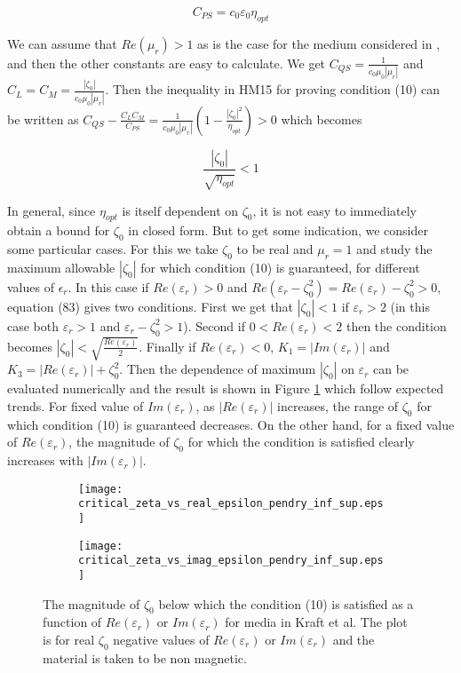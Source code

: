 \begin{equation}
\tag{82}
C_{PS} = c_0\varepsilon_0\eta_{opt}
\end{equation}

We can assume that $Re(\mu_r) > 1$ as is the case for the medium considered in \cite{pendry2016acsphotonics}, 
and then the other constants are easy to calculate. 
We get $C_{QS} = \frac{1}{c_0\mu_0|\mu_r|}$ and $C_L = C_M = \frac{|\zeta_0|}{c_0\mu_0|\mu_r|}$.
Then the inequality in HM15 for proving condition (10) can be written as 
$C_{QS} - \frac{C_LC_M}{C_{PS}} = \frac{1}{c_0\mu_0|\mu_r|}(1 - \frac{|\zeta_0|^2}{\eta_{opt}}) > 0$ which becomes

\begin{equation}
\tag{83}
\frac{|\zeta_0|}{\sqrt{\eta_{opt}}} < 1
\end{equation}

In general, since $\eta_{opt}$ is itself dependent on $\zeta_0$, it is not easy to immediately obtain a bound for $\zeta_0$ in closed form.
But to get some indication, we consider some particular cases.
For this we take $\zeta_0$ to be real and $\mu_r = 1$ and study the maximum allowable $|\zeta_0|$ for which condition (10) is guaranteed,
 for different values of $\epsilon_r$. 
In this case if $Re(\varepsilon_r) > 0$ and $Re(\varepsilon_r - \zeta_0^2) = Re(\varepsilon_r) - \zeta_0^2 > 0$, equation (83) gives two conditions.
First we get that $|\zeta_0| < 1$ if $\varepsilon_r > 2$ (in this case both  $\varepsilon_r > 1$ and $\varepsilon_r - \zeta_0^2 > 1$).
Second if  $0 < Re(\varepsilon_r) < 2$  then the condition becomes $|\zeta_0| < \sqrt{\frac{Re(\varepsilon_r)}{2}}$.
Finally if $Re(\varepsilon_r) < 0$, $K_1 = |Im(\varepsilon_r)|$ and $K_3 = |Re(\varepsilon_r)| + \zeta_0^2$. 
Then the dependence of maximum $|\zeta_0|$ on $\varepsilon_r$  can be evaluated numerically and the result is 
shown in Figure  \ref{fi:critical_zeta_vs_epsilonr_inf_sup} which follow expected trends.
For fixed value of $Im(\varepsilon_r)$, as $|Re(\varepsilon_r)|$ increases, the range of $\zeta_0$ for which condition (10) is guaranteed decreases.
On the other hand, for a fixed value of $Re(\varepsilon_r)$, the magnitude of $\zeta_0$ for which the condition is satisfied clearly increases with $|Im(\varepsilon_r)|$.


\begin{figure}[H]
\centering
\begin{subfigure}[b]{0.49\textwidth}
\texttt{[image: critical\_zeta\_vs\_real\_epsilon\_pendry\_inf\_sup.eps]}
\end{subfigure}
%
\begin{subfigure}[b]{0.49\textwidth}
\centering
\texttt{[image: critical\_zeta\_vs\_imag\_epsilon\_pendry\_inf\_sup.eps]}
\end{subfigure}
\caption{The magnitude of $\zeta_0$ below which the condition (10) is satisfied as a function of $Re(\varepsilon_r)$ or $Im(\varepsilon_r)$ for media in Kraft et al.
The plot is for real $\zeta_0$ negative values of  $Re(\varepsilon_r)$ or $Im(\varepsilon_r)$ and the material is taken to be non magnetic.}
\label{fi:critical_zeta_vs_epsilonr_inf_sup}
\end{figure}

